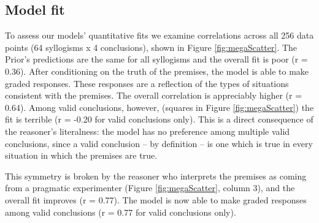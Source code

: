 \documentclass[10pt,letterpaper]{article}
\begin{document}
\subsection{Model fit}

To assess our models' quantitative fits we examine correlations across all 256 data points (64 syllogisms x 4 conclusions), shown in Figure \ref{fig:megaScatter}.
%
The Prior's predictions are the same for all syllogisms and the overall fit is poor (r = 0.36).  After conditioning on the truth of the premises, the model is able to make graded responses. These responses are a reflection of the types of situations consistent with the premises. The overall correlation is appreciably higher (r = 0.64). Among valid conclusions, however, (squares in Figure \ref{fig:megaScatter}) the fit is terrible (r = -0.20 for valid conclusions only). This is a direct consequence of the reasoner's literalness: the model has no preference among multiple valid conclusions, since a valid conclusion -- by definition -- is one which is true in every situation in which the premises are true.

This symmetry is broken by the reasoner who interprets the premises as coming from a pragmatic experimenter (Figure \ref{fig:megaScatter}, column 3), and the overall fit improves (r = 0.77). The model is now able to make graded responses among valid conclusions (r = 0.77 for valid conclusions only). 






\end{document}
